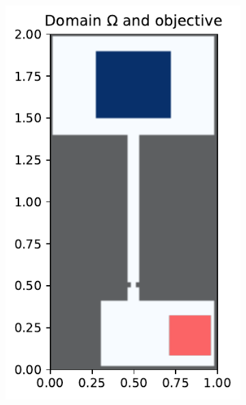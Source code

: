 \documentclass[../report.tex]{subfiles}
\begin{document}
\begin{figure}
	\centering
	\begin{subfigure}[t]{.4\linewidth}
	\includegraphics[width=\linewidth]{../project/images/multimarg_room2/room2_setup.pdf}	
	\end{subfigure}~
	\begin{subfigure}[t]{.48\linewidth}

\end{subfigure}
\end{figure}
\end{document}
